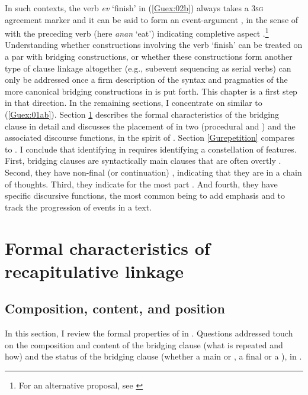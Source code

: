\documentclass[output=paper]{LSP/langsci}
\begin{document}
In such contexts, the verb \textit{ev} `finish' in (\ref{Guex:02b}) always takes a \textsc{3sg} agreement marker and it can be said to form an event-argument , in the sense of \citet[][18]{aikhenvald2006serial}  with the preceding verb (here \textit{anan} `eat') indicating completive aspect \citep[][225, 267]{guerin11}.\footnote{For an alternative proposal, see \citet[][131, 241]{cleary15}} Understanding whether constructions involving the verb `finish' can be treated on a par with bridging constructions, or whether these constructions form another type of clause linkage altogether (e.g., subevent sequencing as serial verbs) can only be addressed once a firm description of the syntax and pragmatics of the more canonical bridging constructions in  is put forth. This chapter is a first step in that direction. In the remaining sections, I concentrate on  similar to (\ref{Guex:01ab}).  Section \ref{Gusec:recapitulative} describes the formal characteristics of the bridging clause in detail and  discusses the placement of  in two  (procedural and ) and the associated discourse functions, in the spirit of \citet{devries.2005}. Section \ref{Gurepetition} compares  to . I conclude that identifying  in  requires identifying a constellation of features. First, bridging clauses are syntactically main clauses that are often overtly . Second, they have non-final (or continuation) , indicating that they are in a chain of thoughts. Third, they indicate for the most part . And fourth, they have specific discursive functions, the most common being to add emphasis and to track the progression of events in a text.


\section{Formal characteristics of recapitulative linkage} 
\label{Gusec:recapitulative}

\subsection{Composition, content, and position} 
\label{Gusec:Composition}
In this section, I review the formal properties of  in . Questions addressed touch on the composition and content of the bridging clause (what is repeated and how) and the status of the bridging clause (whether a main or , a final or a ), in .
\end{document}
